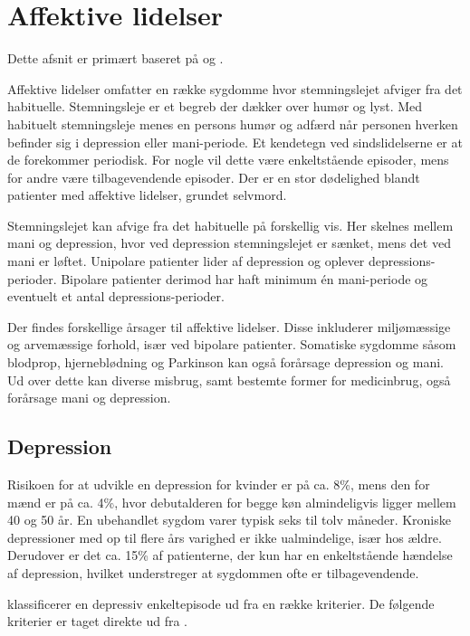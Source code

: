 
\section{Affektive lidelser}\label{sec:affektivelidelser}
Dette afsnit er primært baseret på \citet{misc:affektivelidelser, misc:netpsykdepression, misc:netpsykmani} og \citet{havemann2010grundbog}.

Affektive lidelser omfatter en række sygdomme hvor stemningslejet afviger fra det habituelle.
Stemningsleje er et begreb der dækker over humør og lyst.
Med habituelt stemningsleje menes en persons humør og adfærd når personen hverken befinder sig i depression eller mani-periode.
Et kendetegn ved sindslidelserne er at de forekommer periodisk.
For nogle vil dette være enkeltstående episoder, mens for andre være tilbagevendende episoder.
Der er en stor dødelighed blandt patienter med affektive lidelser, grundet selvmord.

Stemningslejet kan afvige fra det habituelle på forskellig vis.
Her skelnes mellem mani og depression, hvor ved depression stemningslejet er sænket, mens det ved mani er løftet.
Unipolare patienter lider af depression og oplever depressions-perioder.
Bipolare patienter derimod har haft minimum én mani-periode og eventuelt et antal depressions-perioder.

Der findes forskellige årsager til affektive lidelser. 
Disse inkluderer miljømæssige og arvemæssige forhold, især ved bipolare patienter.
Somatiske sygdomme såsom blodprop, hjerneblødning og Parkinson kan også forårsage depression og mani.
Ud over dette kan diverse misbrug, samt bestemte former for medicinbrug, også forårsage mani og depression.

\subsection{Depression}
Risikoen for at udvikle en depression for kvinder er på ca. 8\%, mens den for mænd er på ca. 4\%, hvor debutalderen for begge køn almindeligvis ligger mellem 40 og 50 år.
En ubehandlet sygdom varer typisk seks til tolv måneder.
Kroniske depressioner med op til flere års varighed er ikke ualmindelige, især hos ældre.
Derudover er det ca. 15\% af patienterne, der kun har en enkeltstående hændelse af depression, hvilket understreger at sygdommen ofte er tilbagevendende.\citep{misc:affektivelidelser}

 klassificerer en depressiv enkeltepisode ud fra en række kriterier.
De følgende kriterier er taget direkte ud fra \citet{misc:netpsykdepression}.

